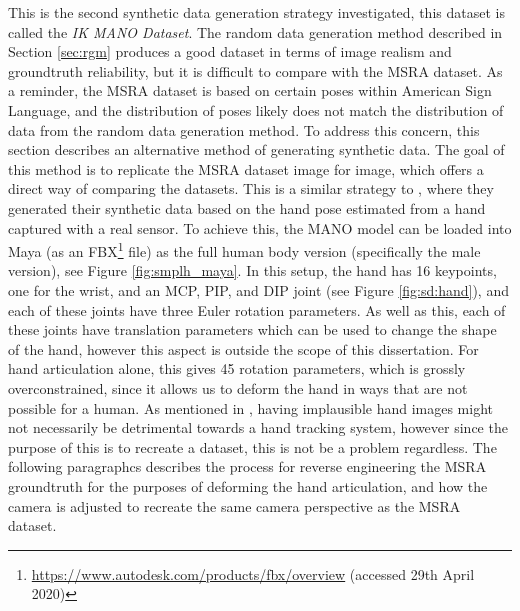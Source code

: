 This is the second synthetic data generation strategy investigated, this dataset is called the {\slshape IK MANO Dataset}. The random data generation method described in Section \ref{sec:rgm} produces a good dataset in terms of image realism and groundtruth reliability, but it is difficult to compare with the MSRA dataset. As a reminder, the MSRA dataset \cite{sun2015cascaded} is based on certain poses within American Sign Language, and the distribution of poses likely does not match the distribution of data from the random data generation method. To address this concern, this section describes an alternative method of generating synthetic data. The goal of this method is to replicate the MSRA dataset image for image, which offers a direct way of comparing the datasets. This is a similar strategy to \cite{mueller2017real}, where they generated their synthetic data based on the hand pose estimated from a hand captured with a real sensor. To achieve this, the MANO model can be loaded into Maya (as an FBX\footnote{\url{https://www.autodesk.com/products/fbx/overview} (accessed 29th April 2020)} file) as the full human body version (specifically the male version), see Figure \ref{fig:smplh_maya}. In this setup, the hand has 16 keypoints, one for the wrist, and an MCP, PIP, and DIP joint (see Figure \ref{fig:sd:hand}), and each of these joints have three Euler rotation parameters. As well as this, each of these joints have translation parameters which can be used to change the shape of the hand, however this aspect is outside the scope of this dissertation. For hand articulation alone, this gives 45 rotation parameters, which is grossly overconstrained, since it allows us to deform the hand in ways that are not possible for a human. As mentioned in \cite{malik2018deephps}, having implausible hand images might not necessarily be detrimental towards a hand tracking system, however since the purpose of this is to recreate a dataset, this is not be a problem regardless. The following paragraphcs describes the process for reverse engineering the MSRA groundtruth for the purposes of deforming the hand articulation, and how the camera is adjusted to recreate the same camera perspective as the MSRA dataset.

